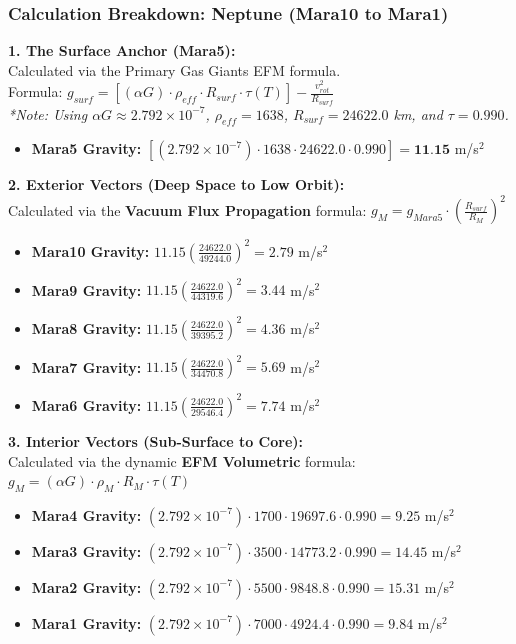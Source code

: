 \documentclass[11pt, a4paper]{article}
\begin{document}
\clearpage
\subsubsection{Calculation Breakdown: Neptune (Mara10 to Mara1)}

\noindent \textbf{1. The Surface Anchor (Mara5):} \\
Calculated via the Primary Gas Giants EFM formula. \\
Formula: $g_{surf} = \left[ (\alpha G) \cdot \rho_{eff} \cdot R_{surf} \cdot \tau(T) \right] - \frac{v_{rot}^2}{R_{surf}}$ \\
\textit{*Note: Using $\alpha G \approx 2.792 \times 10^{-7}$, $\rho_{eff} = 1638$, $R_{surf} = 24622.0$ km, and $\tau = 0.990$.}
\begin{itemize}
  \item \textbf{Mara5 Gravity:} $\left[ (2.792 \times 10^{-7}) \cdot 1638 \cdot 24622.0 \cdot 0.990 \right] = \textbf{11.15}$ m/s$^2$
\end{itemize}

\vspace{0.5em}
\noindent \textbf{2. Exterior Vectors (Deep Space to Low Orbit):} \\
Calculated via the \textbf{Vacuum Flux Propagation} formula: $g_M = g_{Mara5} \cdot \left( \frac{R_{surf}}{R_M} \right)^2$
\begin{itemize}
  \item \textbf{Mara10 Gravity:} $11.15 \left( \frac{24622.0}{49244.0} \right)^2 = 2.79$ m/s$^2$
  \item \textbf{Mara9 Gravity:} $11.15 \left( \frac{24622.0}{44319.6} \right)^2 = 3.44$ m/s$^2$
  \item \textbf{Mara8 Gravity:} $11.15 \left( \frac{24622.0}{39395.2} \right)^2 = 4.36$ m/s$^2$
  \item \textbf{Mara7 Gravity:} $11.15 \left( \frac{24622.0}{34470.8} \right)^2 = 5.69$ m/s$^2$
  \item \textbf{Mara6 Gravity:} $11.15 \left( \frac{24622.0}{29546.4} \right)^2 = 7.74$ m/s$^2$
\end{itemize}

\vspace{0.5em}
\noindent \textbf{3. Interior Vectors (Sub-Surface to Core):} \\
Calculated via the dynamic \textbf{EFM Volumetric} formula: $g_M = (\alpha G) \cdot \rho_{M} \cdot R_M \cdot \tau(T)$
\begin{itemize}
  \item \textbf{Mara4 Gravity:} $(2.792 \times 10^{-7}) \cdot 1700 \cdot 19697.6 \cdot 0.990 = 9.25$ m/s$^2$
  \item \textbf{Mara3 Gravity:} $(2.792 \times 10^{-7}) \cdot 3500 \cdot 14773.2 \cdot 0.990 = 14.45$ m/s$^2$
  \item \textbf{Mara2 Gravity:} $(2.792 \times 10^{-7}) \cdot 5500 \cdot 9848.8 \cdot 0.990 = 15.31$ m/s$^2$
  \item \textbf{Mara1 Gravity:} $(2.792 \times 10^{-7}) \cdot 7000 \cdot 4924.4 \cdot 0.990 = 9.84$ m/s$^2$
\end{itemize}
\end{document}
